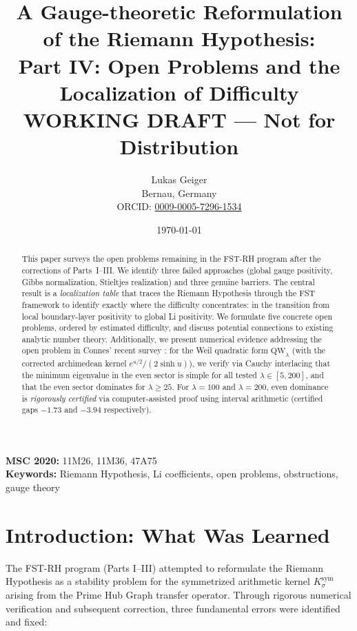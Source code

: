 \documentclass[12pt,a4paper]{article}
\title{A Gauge-theoretic Reformulation of the Riemann Hypothesis:\\ Part IV: Open Problems and the Localization of Difficulty\\[6pt] \large WORKING DRAFT --- Not for Distribution}
\author{Lukas Geiger\\
\small Bernau, Germany\\
\small ORCID: \href{https://orcid.org/0009-0005-7296-1534}{0009-0005-7296-1534}}
\date{\today}
\theoremstyle{definition}
\theoremstyle{remark}
\newcommand{\Ksym}{K_\sigma^{\mathrm{sym}}}
\begin{document}
\maketitle

\begin{abstract}
This paper surveys the open problems remaining in the FST-RH program after the corrections of Parts~I--III. We identify three failed approaches (global gauge positivity, Gibbs normalization, Stieltjes realization) and three genuine barriers. The central result is a \emph{localization table} that traces the Riemann Hypothesis through the FST framework to identify exactly where the difficulty concentrates: in the transition from local boundary-layer positivity to global Li positivity. We formulate five concrete open problems, ordered by estimated difficulty, and discuss potential connections to existing analytic number theory. Additionally, we present numerical evidence addressing the open problem in Connes' recent survey \cite{Connes2025}: for the Weil quadratic form $\mathrm{QW}_\lambda$ (with the corrected archimedean kernel $e^{u/2}/(2\sinh u)$), we verify via Cauchy interlacing that the minimum eigenvalue in the even sector is simple for all tested $\lambda \in [5,200]$, and that the even sector dominates for $\lambda \geq 25$. For $\lambda = 100$ and $\lambda = 200$, even dominance is \emph{rigorously certified} via computer-assisted proof using interval arithmetic (certified gaps $-1.73$ and $-3.94$ respectively).
\end{abstract}

\noindent\textbf{MSC 2020:} 11M26, 11M36, 47A75\\
\textbf{Keywords:} Riemann Hypothesis, Li coefficients, open problems, obstructions, gauge theory

\tableofcontents

\section{Introduction: What Was Learned}

The FST-RH program (Parts I--III) attempted to reformulate the Riemann Hypothesis as a stability problem for the symmetrized arithmetic kernel $\Ksym$ arising from the Prime Hub Graph transfer operator. Through rigorous numerical verification and subsequent correction, three fundamental errors were identified and fixed:
\end{document}
